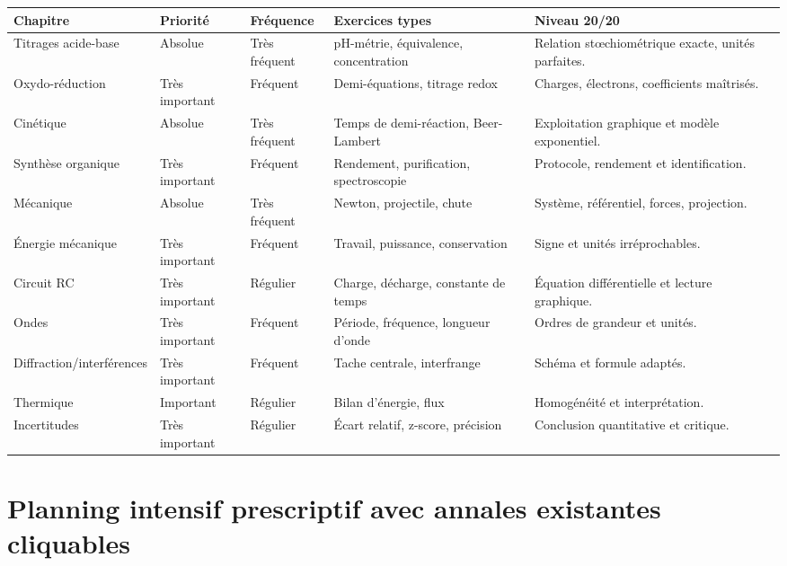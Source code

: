 \documentclass[11pt,a4paper]{article}
\begin{document}
\footnotesize
\begin{longtable}{|p{3cm}|p{2.6cm}|p{2.6cm}|p{4.2cm}|p{4.2cm}|}
\hline
\textbf{Chapitre} & \textbf{Priorité} & \textbf{Fréquence} & \textbf{Exercices types} & \textbf{Niveau 20/20}\\
\hline
Titrages acide-base & Absolue & Très fréquent & pH-métrie, équivalence, concentration & Relation stœchiométrique exacte, unités parfaites.\\
\hline
Oxydo-réduction & Très important & Fréquent & Demi-équations, titrage redox & Charges, électrons, coefficients maîtrisés.\\
\hline
Cinétique & Absolue & Très fréquent & Temps de demi-réaction, Beer-Lambert & Exploitation graphique et modèle exponentiel.\\
\hline
Synthèse organique & Très important & Fréquent & Rendement, purification, spectroscopie & Protocole, rendement et identification.\\
\hline
Mécanique & Absolue & Très fréquent & Newton, projectile, chute & Système, référentiel, forces, projection.\\
\hline
Énergie mécanique & Très important & Fréquent & Travail, puissance, conservation & Signe et unités irréprochables.\\
\hline
Circuit RC & Très important & Régulier & Charge, décharge, constante de temps & Équation différentielle et lecture graphique.\\
\hline
Ondes & Très important & Fréquent & Période, fréquence, longueur d'onde & Ordres de grandeur et unités.\\
\hline
Diffraction/interférences & Très important & Fréquent & Tache centrale, interfrange & Schéma et formule adaptés.\\
\hline
Thermique & Important & Régulier & Bilan d'énergie, flux & Homogénéité et interprétation.\\
\hline
Incertitudes & Très important & Régulier & Écart relatif, z-score, précision & Conclusion quantitative et critique.\\
\hline
\end{longtable}
\normalsize

\section{Planning intensif prescriptif avec annales existantes cliquables}
\end{document}
